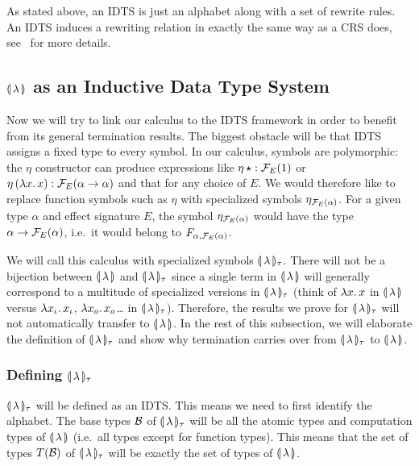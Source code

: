 As stated above, an IDTS is just an alphabet along with a set of rewrite
rules. An IDTS induces a rewriting relation in exactly the same way as a
CRS does, see~\cite{blanqui2000termination} for more details.


\subsection{$\llparenthesis \, \lambda \, \rrparenthesis$ as an Inductive Data Type System}
\label{ssec:banana-idts}

Now we will try to link our calculus to the IDTS framework in order to
benefit from its general termination results. The biggest obstacle will be
that IDTS assigns a fixed type to every symbol. In our calculus, symbols
are polymorphic: the $\eta$ constructor can produce expressions like
$\eta\,\star : \mathcal{F}_E(1)$ or $\eta\,(\lambda x.\, x) : \mathcal{F}_E(\alpha \to
\alpha)$ and that for any choice of $E$. We would therefore like to replace
function symbols such as $\eta$ with specialized symbols
$\eta_{\mathcal{F}_E(\alpha)}$. For a given type $\alpha$ and effect signature $E$,
the symbol $\eta_{\mathcal{F}_E(\alpha)}$ would have the type $\alpha \to
\mathcal{F}_E(\alpha)$, i.e.\ it would belong to $F_{\alpha,\mathcal{F}_E(\alpha)}$.

We will call this calculus with specialized symbols
$\llparenthesis \, \lambda \, \rrparenthesis_\tau$. There will not be a bijection between
$\llparenthesis \, \lambda \, \rrparenthesis$ and $\llparenthesis \, \lambda \, \rrparenthesis_\tau$ since a single term in
$\llparenthesis \, \lambda \, \rrparenthesis$ will generally correspond to a multitude of specialized
versions in $\llparenthesis \, \lambda \, \rrparenthesis_\tau$ (think of $\lambda x.\, x$ in
$\llparenthesis \, \lambda \, \rrparenthesis$ versus $\lambda x_\iota.\, x_\iota$, $\lambda x_o.\, x_o$\ldots
in $\llparenthesis \, \lambda \, \rrparenthesis_\tau$). Therefore, the results we prove for
$\llparenthesis \, \lambda \, \rrparenthesis_\tau$ will not automatically transfer to
$\llparenthesis \, \lambda \, \rrparenthesis$. In the rest of this subsection, we will elaborate the
definition of $\llparenthesis \, \lambda \, \rrparenthesis_\tau$ and show why termination carries over
from $\llparenthesis \, \lambda \, \rrparenthesis_\tau$ to $\llparenthesis \, \lambda \, \rrparenthesis$.


\subsubsection{Defining $\llparenthesis \, \lambda \, \rrparenthesis_\tau$}
\label{sssec:banana-tau}

$\llparenthesis \, \lambda \, \rrparenthesis_\tau$ will be defined as an IDTS. This means we need to
first identify the alphabet. The base types $\mathcal{B}$ of
$\llparenthesis \, \lambda \, \rrparenthesis_\tau$ will be all the atomic types and computation types
of $\llparenthesis \, \lambda \, \rrparenthesis$ (i.e.\ all types except for function types). This
means that the set of types $T(\mathcal{B})$ of $\llparenthesis \, \lambda \, \rrparenthesis_\tau$ will be
exactly the set of types of $\llparenthesis \, \lambda \, \rrparenthesis$.

